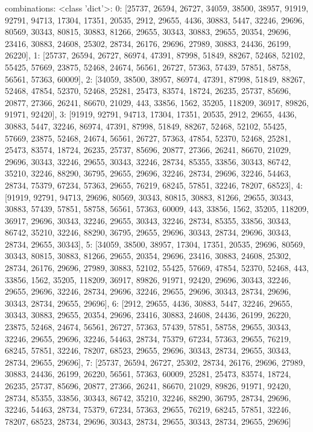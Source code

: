 \documentclass[12pt,a4paper,oneside]{article}
\begin{document}
combinations:
<class 'dict'>: {0: [25737, 26594, 26727, 34059, 38500, 38957, 91919, 92791, 94713, 17304, 17351, 20535, 2912, 29655, 4436, 30883, 5447, 32246, 29696, 80569, 30343, 80815, 30883, 81266, 29655, 30343, 30883, 29655, 20354, 29696, 23416, 30883, 24608, 25302, 28734, 26176, 29696, 27989, 30883, 24436, 26199, 26220], 1: [25737, 26594, 26727, 86974, 47391, 87998, 51849, 88267, 52468, 52102, 55425, 57669, 23875, 52468, 24674, 56561, 26727, 57363, 57439, 57851, 58758, 56561, 57363, 60009], 2: [34059, 38500, 38957, 86974, 47391, 87998, 51849, 88267, 52468, 47854, 52370, 52468, 25281, 25473, 83574, 18724, 26235, 25737, 85696, 20877, 27366, 26241, 86670, 21029, 443, 33856, 1562, 35205, 118209, 36917, 89826, 91971, 92420], 3: [91919, 92791, 94713, 17304, 17351, 20535, 2912, 29655, 4436, 30883, 5447, 32246, 86974, 47391, 87998, 51849, 88267, 52468, 52102, 55425, 57669, 23875, 52468, 24674, 56561, 26727, 57363, 47854, 52370, 52468, 25281, 25473, 83574, 18724, 26235, 25737, 85696, 20877, 27366, 26241, 86670, 21029, 29696, 30343, 32246, 29655, 30343, 32246, 28734, 85355, 33856, 30343, 86742, 35210, 32246, 88290, 36795, 29655, 29696, 32246, 28734, 29696, 32246, 54463, 28734, 75379, 67234, 57363, 29655, 76219, 68245, 57851, 32246, 78207, 68523], 4: [91919, 92791, 94713, 29696, 80569, 30343, 80815, 30883, 81266, 29655, 30343, 30883, 57439, 57851, 58758, 56561, 57363, 60009, 443, 33856, 1562, 35205, 118209, 36917, 29696, 30343, 32246, 29655, 30343, 32246, 28734, 85355, 33856, 30343, 86742, 35210, 32246, 88290, 36795, 29655, 29696, 30343, 28734, 29696, 30343, 28734, 29655, 30343], 5: [34059, 38500, 38957, 17304, 17351, 20535, 29696, 80569, 30343, 80815, 30883, 81266, 29655, 20354, 29696, 23416, 30883, 24608, 25302, 28734, 26176, 29696, 27989, 30883, 52102, 55425, 57669, 47854, 52370, 52468, 443, 33856, 1562, 35205, 118209, 36917, 89826, 91971, 92420, 29696, 30343, 32246, 29655, 29696, 32246, 28734, 29696, 32246, 29655, 29696, 30343, 28734, 29696, 30343, 28734, 29655, 29696], 6: [2912, 29655, 4436, 30883, 5447, 32246, 29655, 30343, 30883, 29655, 20354, 29696, 23416, 30883, 24608, 24436, 26199, 26220, 23875, 52468, 24674, 56561, 26727, 57363, 57439, 57851, 58758, 29655, 30343, 32246, 29655, 29696, 32246, 54463, 28734, 75379, 67234, 57363, 29655, 76219, 68245, 57851, 32246, 78207, 68523, 29655, 29696, 30343, 28734, 29655, 30343, 28734, 29655, 29696], 7: [25737, 26594, 26727, 25302, 28734, 26176, 29696, 27989, 30883, 24436, 26199, 26220, 56561, 57363, 60009, 25281, 25473, 83574, 18724, 26235, 25737, 85696, 20877, 27366, 26241, 86670, 21029, 89826, 91971, 92420, 28734, 85355, 33856, 30343, 86742, 35210, 32246, 88290, 36795, 28734, 29696, 32246, 54463, 28734, 75379, 67234, 57363, 29655, 76219, 68245, 57851, 32246, 78207, 68523, 28734, 29696, 30343, 28734, 29655, 30343, 28734, 29655, 29696]}
\end{document}
